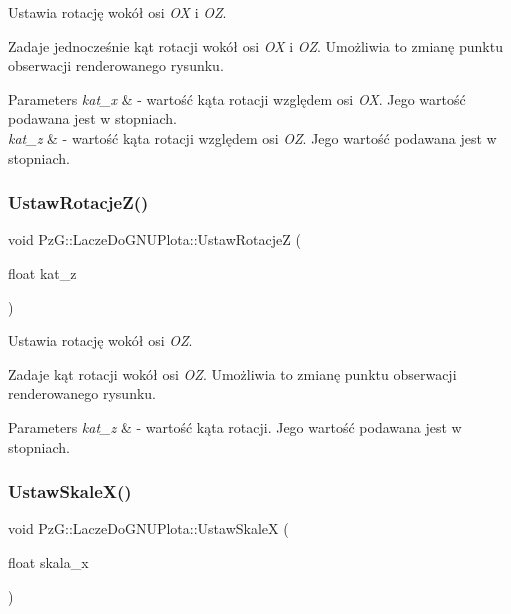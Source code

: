 Ustawia rotację wokół osi {\itshape OX} i {\itshape OZ}. 

Zadaje jednocześnie kąt rotacji wokół osi {\itshape OX} i {\itshape OZ}. Umożliwia to zmianę punktu obserwacji renderowanego rysunku. 
\begin{DoxyParams}{Parameters}
{\em kat\+\_\+x} & -\/ wartość kąta rotacji względem osi {\itshape OX}. Jego wartość podawana jest w stopniach. \\
\hline
{\em kat\+\_\+z} & -\/ wartość kąta rotacji względem osi {\itshape OZ}. Jego wartość podawana jest w stopniach. \\
\hline
\end{DoxyParams}
\mbox{\label{classPzG_1_1LaczeDoGNUPlota_a458399aa2a8f4b3f00ccd5b272857ea1}} 
\subsubsection{\texorpdfstring{Ustaw\+Rotacje\+Z()}{UstawRotacjeZ()}}
{\footnotesize\ttfamily void Pz\+G\+::\+Lacze\+Do\+G\+N\+U\+Plota\+::\+Ustaw\+RotacjeZ (\begin{DoxyParamCaption}\item[{float}]{kat\+\_\+z }\end{DoxyParamCaption})\hspace{0.3cm}{\ttfamily [inline]}}



Ustawia rotację wokół osi {\itshape OZ}. 

Zadaje kąt rotacji wokół osi {\itshape OZ}. Umożliwia to zmianę punktu obserwacji renderowanego rysunku. 
\begin{DoxyParams}{Parameters}
{\em kat\+\_\+z} & -\/ wartość kąta rotacji. Jego wartość podawana jest w stopniach. \\
\hline
\end{DoxyParams}
\mbox{\label{classPzG_1_1LaczeDoGNUPlota_a855b8338bfe3e5d294d719f24b11090e}} 
\subsubsection{\texorpdfstring{Ustaw\+Skale\+X()}{UstawSkaleX()}}
{\footnotesize\ttfamily void Pz\+G\+::\+Lacze\+Do\+G\+N\+U\+Plota\+::\+Ustaw\+SkaleX (\begin{DoxyParamCaption}\item[{float}]{skala\+\_\+x }\end{DoxyParamCaption})\hspace{0.3cm}{\ttfamily [inline]}}



